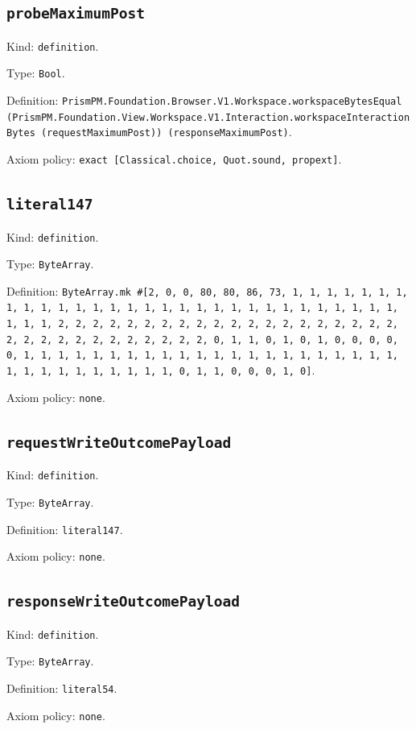 \documentclass[11pt]{article}
\begin{document}
\subsection*{\texttt{probeMaximumPost}}
\noindent Kind: \texttt{definition}.\par
\noindent Type: \texttt{Bool}.\par
\noindent Definition: \texttt{PrismPM.Foundation.Browser.V1.Workspace.workspaceBytesEqual (PrismPM.Foundation.View.Workspace.V1.Interaction.workspaceInteractionBytes (requestMaximumPost)) (responseMaximumPost)}.\par
\noindent Axiom policy: \texttt{exact [Classical.choice, Quot.sound, propext]}.\par
\subsection*{\texttt{literal147}}
\noindent Kind: \texttt{definition}.\par
\noindent Type: \texttt{ByteArray}.\par
\noindent Definition: \texttt{ByteArray.mk \#[2, 0, 0, 80, 80, 86, 73, 1, 1, 1, 1, 1, 1, 1, 1, 1, 1, 1, 1, 1, 1, 1, 1, 1, 1, 1, 1, 1, 1, 1, 1, 1, 1, 1, 1, 1, 1, 1, 1, 1, 2, 2, 2, 2, 2, 2, 2, 2, 2, 2, 2, 2, 2, 2, 2, 2, 2, 2, 2, 2, 2, 2, 2, 2, 2, 2, 2, 2, 2, 2, 2, 2, 0, 1, 1, 0, 1, 0, 1, 0, 0, 0, 0, 0, 1, 1, 1, 1, 1, 1, 1, 1, 1, 1, 1, 1, 1, 1, 1, 1, 1, 1, 1, 1, 1, 1, 1, 1, 1, 1, 1, 1, 1, 1, 1, 1, 0, 1, 1, 0, 0, 0, 1, 0]}.\par
\noindent Axiom policy: \texttt{none}.\par
\subsection*{\texttt{requestWriteOutcomePayload}}
\noindent Kind: \texttt{definition}.\par
\noindent Type: \texttt{ByteArray}.\par
\noindent Definition: \texttt{literal147}.\par
\noindent Axiom policy: \texttt{none}.\par
\subsection*{\texttt{responseWriteOutcomePayload}}
\noindent Kind: \texttt{definition}.\par
\noindent Type: \texttt{ByteArray}.\par
\noindent Definition: \texttt{literal54}.\par
\noindent Axiom policy: \texttt{none}.\par
\end{document}
